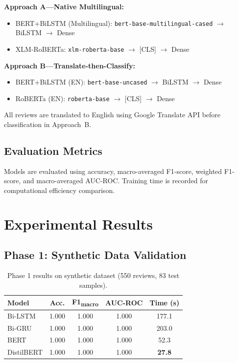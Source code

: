 \documentclass[10pt,twocolumn,a4paper]{article}
\begin{document}
\textbf{Approach A---Native Multilingual:}
\begin{itemize}[leftmargin=*,noitemsep,topsep=2pt]
    \item BERT+BiLSTM (Multilingual): \texttt{bert-base-multilingual-cased} $\rightarrow$ BiLSTM $\rightarrow$ Dense
    \item XLM-RoBERTa: \texttt{xlm-roberta-base} $\rightarrow$ [CLS] $\rightarrow$ Dense
\end{itemize}

\textbf{Approach B---Translate-then-Classify:}
\begin{itemize}[leftmargin=*,noitemsep,topsep=2pt]
    \item BERT+BiLSTM (EN): \texttt{bert-base-uncased} $\rightarrow$ BiLSTM $\rightarrow$ Dense
    \item RoBERTa (EN): \texttt{roberta-base} $\rightarrow$ [CLS] $\rightarrow$ Dense
\end{itemize}

All reviews are translated to English using Google Translate API before classification in Approach~B.

\subsection{Evaluation Metrics}
Models are evaluated using accuracy, macro-averaged F1-score, weighted F1-score, and macro-averaged AUC-ROC. Training time is recorded for computational efficiency comparison.

\section{Experimental Results}
\label{sec:results}

\subsection{Phase 1: Synthetic Data Validation}

\begin{table}[t]
\caption{Phase 1 results on synthetic dataset (550 reviews, 83 test samples).}
\label{tab:phase1}
\setlength{\tabcolsep}{24pt}
\renewcommand{\arraystretch}{1.4}
\begin{tabular}{l c c c c}
\toprule
\textbf{Model} & \textbf{Acc.} & \textbf{F1\textsubscript{macro}} & \textbf{AUC-ROC} & \textbf{Time (s)} \\
\midrule
Bi-LSTM & 1.000 & 1.000 & 1.000 & 177.1 \\
Bi-GRU & 1.000 & 1.000 & 1.000 & 203.0 \\
BERT & 1.000 & 1.000 & 1.000 & 52.3 \\
DistilBERT & 1.000 & 1.000 & 1.000 & \textbf{27.8} \\
\bottomrule
\end{tabular}
\end{table}
\end{document}
